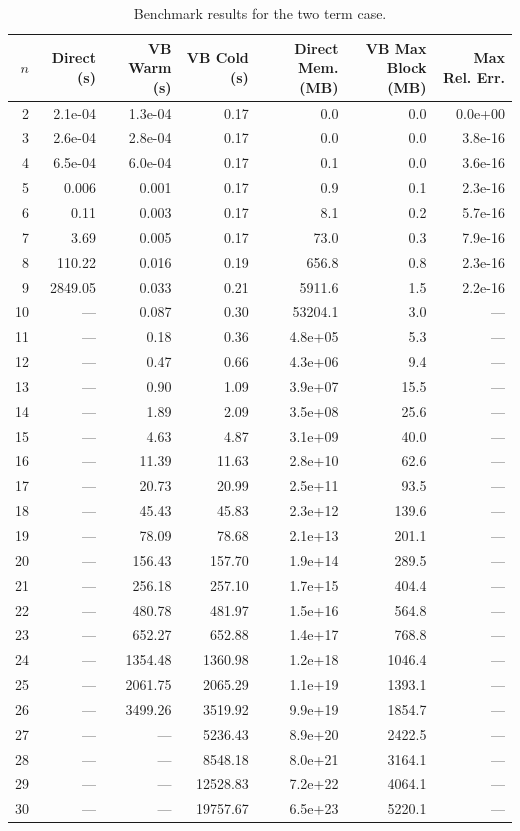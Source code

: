 \begin{table}[htbp]
\centering
\caption{Benchmark results for the two term case.}
\label{tab:benchmark_two_term}
\begin{tabular}{r r r r r r r}
\toprule
$n$ & Direct (s) & VB Warm (s) & VB Cold (s) & Direct Mem. (MB) & VB Max Block (MB) & Max Rel. Err. \\
\midrule
2 & 2.1e-04 & 1.3e-04 & 0.17 & 0.0 & 0.0 & 0.0e+00 \\
3 & 2.6e-04 & 2.8e-04 & 0.17 & 0.0 & 0.0 & 3.8e-16 \\
4 & 6.5e-04 & 6.0e-04 & 0.17 & 0.1 & 0.0 & 3.6e-16 \\
5 & 0.006 & 0.001 & 0.17 & 0.9 & 0.1 & 2.3e-16 \\
6 & 0.11 & 0.003 & 0.17 & 8.1 & 0.2 & 5.7e-16 \\
7 & 3.69 & 0.005 & 0.17 & 73.0 & 0.3 & 7.9e-16 \\
8 & 110.22 & 0.016 & 0.19 & 656.8 & 0.8 & 2.3e-16 \\
9 & 2849.05 & 0.033 & 0.21 & 5911.6 & 1.5 & 2.2e-16 \\
10 & --- & 0.087 & 0.30 & 53204.1 & 3.0 & --- \\
11 & --- & 0.18 & 0.36 & 4.8e+05 & 5.3 & --- \\
12 & --- & 0.47 & 0.66 & 4.3e+06 & 9.4 & --- \\
13 & --- & 0.90 & 1.09 & 3.9e+07 & 15.5 & --- \\
14 & --- & 1.89 & 2.09 & 3.5e+08 & 25.6 & --- \\
15 & --- & 4.63 & 4.87 & 3.1e+09 & 40.0 & --- \\
16 & --- & 11.39 & 11.63 & 2.8e+10 & 62.6 & --- \\
17 & --- & 20.73 & 20.99 & 2.5e+11 & 93.5 & --- \\
18 & --- & 45.43 & 45.83 & 2.3e+12 & 139.6 & --- \\
19 & --- & 78.09 & 78.68 & 2.1e+13 & 201.1 & --- \\
20 & --- & 156.43 & 157.70 & 1.9e+14 & 289.5 & --- \\
21 & --- & 256.18 & 257.10 & 1.7e+15 & 404.4 & --- \\
22 & --- & 480.78 & 481.97 & 1.5e+16 & 564.8 & --- \\
23 & --- & 652.27 & 652.88 & 1.4e+17 & 768.8 & --- \\
24 & --- & 1354.48 & 1360.98 & 1.2e+18 & 1046.4 & --- \\
25 & --- & 2061.75 & 2065.29 & 1.1e+19 & 1393.1 & --- \\
26 & --- & 3499.26 & 3519.92 & 9.9e+19 & 1854.7 & --- \\
27 & --- & --- & 5236.43 & 8.9e+20 & 2422.5 & --- \\
28 & --- & --- & 8548.18 & 8.0e+21 & 3164.1 & --- \\
29 & --- & --- & 12528.83 & 7.2e+22 & 4064.1 & --- \\
30 & --- & --- & 19757.67 & 6.5e+23 & 5220.1 & --- \\
\bottomrule
\end{tabular}
\end{table}
